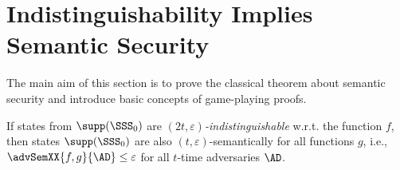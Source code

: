 \documentclass{llncs}
\begin{document}
\section{Indistinguishability Implies Semantic Security}

The main aim of this section is to prove the classical theorem about
semantic security and introduce basic concepts of game-playing
proofs.

\begin{theorem}\label{thm:ind-sem}
  If states from $\supp(\SSS_0)$ are
  \emph{$(2t,\varepsilon)$-indistinguishable} w.r.t. the function $f$,
  then states $\supp(\SSS_0)$ are also $(t,\varepsilon)$-semantically
  for all functions $g$, i.e., $\advSemXX{f,g}{\AD}\leq\varepsilon$
  for all $t$-time adversaries $\AD$.
\end{theorem}
\end{document}
